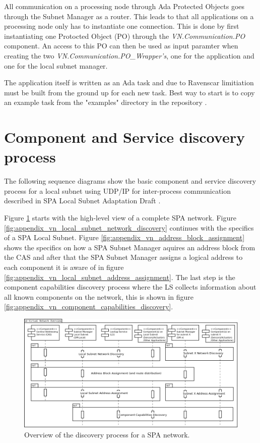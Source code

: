 All communication on a processing node through Ada Protected Objects goes
through the Subnet Manager as a router. This leads to that all applications on
a processing node only has to instantiate one connection. This is done by first
instantiating one Protocted Object (PO) through the \emph{VN.Communication.PO}
component. An access to this PO can then be used as input paramter when
creating the two \emph{VN.Communication.PO\_Wrapper's}, one for the application
and one for the local subnet manager.

The application itself is written as an Ada task and due to Ravenscar
limitiation must be built from the ground up for each new task. Best way to
start is to copy an example task from the "examples" directory in the
repository \cite{web:github-vn-lib}.

\section{Component and Service discovery process}\label{sec:discovery_process}
The following sequence diagrams show the basic component and service discovery
process for a local subnet using UDP/IP for inter-process communication
described in SPA Local Subnet Adaptation Draft \cite{spa:local-subnet}.

Figure
\ref{fig:appendix_vn_discovery_overview} starts with the high-level view of a
complete SPA network. Figure
\ref{fig:appendix_vn_local_subnet_network_discovery} continues with the
specifics of a SPA Local Subnet. Figure
\ref{fig:appendix_vn_address_block_assignment} shows the specifics on how a SPA
Subnet Manager aquires an address block from the CAS and after that the SPA
Subnet Manager assigns a logical address to each component it is aware of in
figure \ref{fig:appendix_vn_local_subnet_address_assignment}. The last step is the
component capabilities discovery process where the LS collects
information about all known components on the network, this is shown in figure
\ref{fig:appendix_vn_component_capabilities_discovery}.

\begin{figure}[h]
    \centering
    \includegraphics[width=\textwidth]{figures/vn_discovery_overview}
    \caption{Overview of the discovery process for a SPA network.}
    \label{fig:appendix_vn_discovery_overview}
\end{figure}

